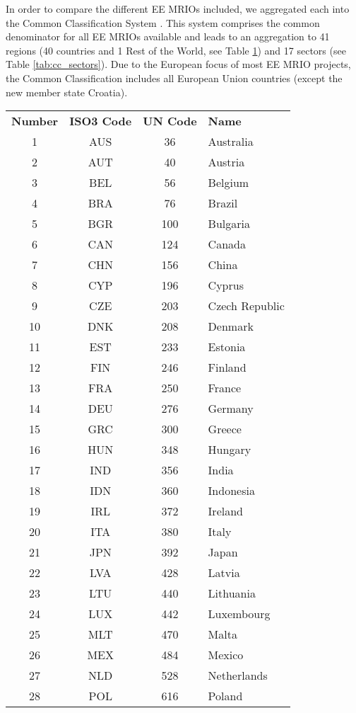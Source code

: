 In order to compare the different EE MRIOs included, we aggregated each into the Common Classification System \cite{Steen_Olsen_2014}. 
This system comprises the common denominator for all EE MRIOs available and leads to an aggregation to 41 regions (40 countries and 1 Rest of the World, see Table \ref{tab:cc_regions}) and 17 sectors (see Table \ref{tab:cc_sectors}). 
Due to the European focus of most EE MRIO projects, the Common Classification includes all European Union countries (except the new member state Croatia).


\begin{table}
\label{tab:cc_regions}
\begin{tabular}{ c c c l }
\textbf{Number} & \textbf{ISO3 Code} & \textbf{UN Code} & \textbf{Name}\\
1&AUS & 36 & Australia\\
2&AUT & 40 & Austria\\
3&BEL & 56 & Belgium\\
4&BRA & 76 & Brazil\\
5&BGR & 100 & Bulgaria\\
6&CAN & 124 & Canada\\
7&CHN & 156 & China\\
8&CYP & 196 & Cyprus\\
9&CZE & 203 & Czech Republic\\
10&DNK & 208 & Denmark\\
11&EST & 233 & Estonia\\
12&FIN & 246 & Finland\\
13&FRA & 250 & France\\
14&DEU & 276 & Germany\\
15&GRC & 300 & Greece\\
16&HUN & 348 & Hungary\\
17&IND & 356 & India\\
18&IDN & 360 & Indonesia\\
19&IRL & 372 & Ireland\\
20&ITA & 380 & Italy\\
21&JPN & 392 & Japan\\
22&LVA & 428 & Latvia\\
23&LTU & 440 & Lithuania\\
24&LUX & 442 & Luxembourg\\
25&MLT & 470 & Malta\\
26&MEX & 484 & Mexico\\
27&NLD & 528 & Netherlands\\
28&POL & 616 & Poland\\

\end{tabular}
\end{table}
